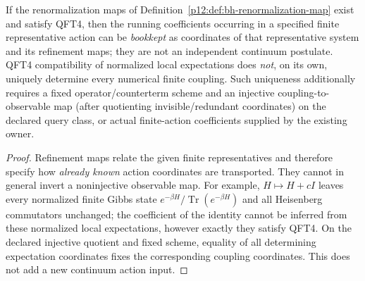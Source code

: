 \documentclass[12pt,a4paper]{article}
\begin{document}
\begin{proposition}
\label{p12:prop:rg-not-new-input}
If the renormalization maps of Definition~\ref{p12:def:bh-renormalization-map}
exist and satisfy QFT4, then the running coefficients occurring in a
specified finite representative action can be \emph{bookkept} as coordinates
of that representative system and its refinement maps; they are not an
independent continuum postulate. QFT4 compatibility of normalized local
expectations does \emph{not}, on its own, uniquely determine every
numerical finite coupling. Such uniqueness additionally requires a fixed
operator/counterterm scheme and an injective coupling-to-observable map
(after quotienting invisible/redundant coordinates) on the declared query
class, or actual finite-action coefficients supplied by the existing owner.
\end{proposition}
\begin{proof}
Refinement maps relate the given finite representatives and therefore
specify how \emph{already known} action coordinates are transported.
They cannot in general invert a noninjective observable map. For example,
\(H\mapsto H+cI\) leaves every normalized finite Gibbs state
\(e^{-\beta H}/\operatorname{Tr}(e^{-\beta H})\) and all Heisenberg
commutators unchanged; the coefficient of the identity cannot be inferred
from these normalized local expectations, however exactly they satisfy
QFT4. On the declared injective quotient and fixed scheme, equality of
all determining expectation coordinates fixes the corresponding coupling
coordinates. This does not add a new continuum action input.
\end{proof}
\end{document}
